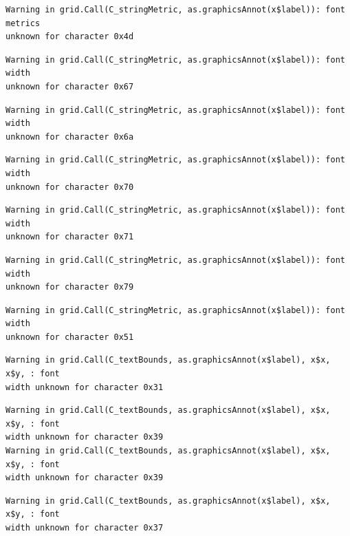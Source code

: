 \documentclass[
  letterpaper,
]{scrbook}
\begin{document}
\begin{verbatim}
Warning in grid.Call(C_stringMetric, as.graphicsAnnot(x$label)): font metrics
unknown for character 0x4d
\end{verbatim}

\begin{verbatim}
Warning in grid.Call(C_stringMetric, as.graphicsAnnot(x$label)): font width
unknown for character 0x67
\end{verbatim}

\begin{verbatim}
Warning in grid.Call(C_stringMetric, as.graphicsAnnot(x$label)): font width
unknown for character 0x6a
\end{verbatim}

\begin{verbatim}
Warning in grid.Call(C_stringMetric, as.graphicsAnnot(x$label)): font width
unknown for character 0x70
\end{verbatim}

\begin{verbatim}
Warning in grid.Call(C_stringMetric, as.graphicsAnnot(x$label)): font width
unknown for character 0x71
\end{verbatim}

\begin{verbatim}
Warning in grid.Call(C_stringMetric, as.graphicsAnnot(x$label)): font width
unknown for character 0x79
\end{verbatim}

\begin{verbatim}
Warning in grid.Call(C_stringMetric, as.graphicsAnnot(x$label)): font width
unknown for character 0x51
\end{verbatim}

\begin{verbatim}
Warning in grid.Call(C_textBounds, as.graphicsAnnot(x$label), x$x, x$y, : font
width unknown for character 0x31
\end{verbatim}

\begin{verbatim}
Warning in grid.Call(C_textBounds, as.graphicsAnnot(x$label), x$x, x$y, : font
width unknown for character 0x39
Warning in grid.Call(C_textBounds, as.graphicsAnnot(x$label), x$x, x$y, : font
width unknown for character 0x39
\end{verbatim}

\begin{verbatim}
Warning in grid.Call(C_textBounds, as.graphicsAnnot(x$label), x$x, x$y, : font
width unknown for character 0x37
\end{verbatim}
\end{document}
